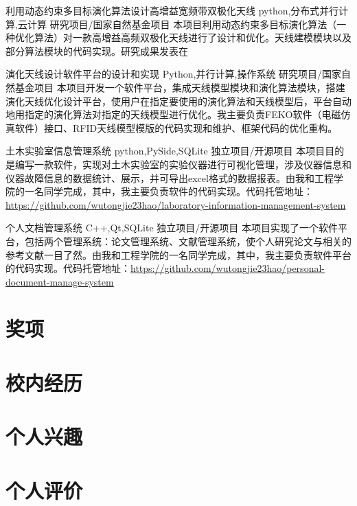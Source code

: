 \documentclass[11pt,a4paper,sans]{moderncv}   %
\begin{document}
\begin{CJK}{UTF8}{gbsn}
{利用动态约束多目标演化算法设计高增益宽频带双极化天线}
{python,分布式并行计算,云计算}
{研究项目/国家自然基金项目}{}
{本项目利用动态约束多目标演化算法（一种优化算法）对一款高增益高频双极化天线进行了设计和优化。天线建模模块以及部分算法模块的代码实现。研究成果发表在}
\vspace*{0.2\baselineskip}

{演化天线设计软件平台的设计和实现}
{Python,并行计算,操作系统}
{研究项目/国家自然基金项目}{}
{本项目开发一个软件平台，集成天线模型模块和演化算法模块，搭建演化天线优化设计平台，使用户在指定要使用的演化算法和天线模型后，平台自动地用指定的演化算法对指定的天线模型进行优化。我主要负责FEKO软件（电磁仿真软件）接口、RFID天线模型模版的代码实现和维护、框架代码的优化重构。}
\vspace*{0.2\baselineskip}

{土木实验室信息管理系统}
{python,PySide,SQLite}
{独立项目/开源项目}{}
{本项目目的是编写一款软件，实现对土木实验室的实验仪器进行可视化管理，涉及仪器信息和仪器故障信息的数据统计、展示，并可导出excel格式的数据报表。由我和工程学院的一名同学完成，其中，我主要负责软件的代码实现。代码托管地址：\href{https://github.com/wutongjie23hao/laboratory-information-management-system}{https://github.com/wutongjie23hao/laboratory-information-management-system}}
\vspace*{0.2\baselineskip}

{个人文档管理系统}
{C++,Qt,SQLite}
{独立项目/开源项目}{}
{本项目实现了一个软件平台，包括两个管理系统：论文管理系统、文献管理系统，使个人研究论文与相关的参考文献一目了然。由我和工程学院的一名同学完成，其中，我主要负责软件平台的代码实现。代码托管地址：\href{https://github.com/wutongjie23hao/personal-document-manage-system}{https://github.com/wutongjie23hao/personal-document-manage-system}}
\vspace*{0.2\baselineskip}

\section{奖项}

\section{校内经历}

\section{个人兴趣}

\section{个人评价}

\renewcommand{\baselinestretch}{1.0} 
 
\closesection{}                   %
\renewcommand{\listitemsymbol}{-} %
\clearpage\end{CJK} 
\end{document}
